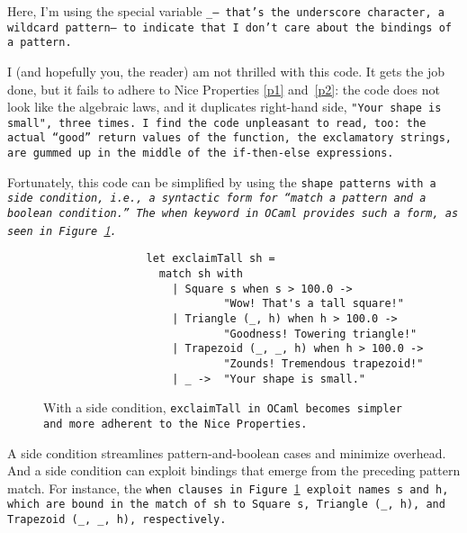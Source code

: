 \documentclass[manuscript,screen,review, 12pt, nonacm]{acmart}
\begin{document}
    Here, I'm using the special variable \tt{\_}--- that's the underscore
    character, a wildcard pattern--- to indicate that I don't care about the
    bindings of a pattern. 

    I (and hopefully you, the reader) am not thrilled with this code. It gets
    the job done, but it fails to adhere to Nice Properties \ref{p1}
    and~\ref{p2}: the code does not look like the algebraic laws, and it
    duplicates right-hand side, \tt{"Your shape is small"}, three times. I find
    the code unpleasant to read, too: the actual “good” return values of the
    function, the exclamatory strings, are gummed up in the middle of the
    \tt{if-then-else} expressions.
    
    Fortunately, this code can be simplified by using the \tt{shape} patterns
    with a \it{side condition}, i.e., a syntactic form for “match a pattern
    \it{and} a boolean condition.” The \tt{when} keyword in OCaml provides such
    a form, as seen in Figure~\ref{fig:whenexclaimtall}.
        
        \begin{figure}[]
            \begin{verbatim}
                let exclaimTall sh =
                  match sh with 
                    | Square s when s > 100.0 ->
                            "Wow! That's a tall square!"
                    | Triangle (_, h) when h > 100.0 ->
                            "Goodness! Towering triangle!"
                    | Trapezoid (_, _, h) when h > 100.0 -> 
                            "Zounds! Tremendous trapezoid!"
                    | _ ->  "Your shape is small." 
                \end{verbatim}
            \caption{With a side condition, \tt{exclaimTall} in OCaml becomes
            simpler and more adherent to the Nice Properties.} 
            \label{fig:whenexclaimtall}
        \end{figure}

    A side condition streamlines pattern-and-boolean cases and minimize
    overhead. And a side condition can exploit bindings that emerge from the
    preceding pattern match. For instance, the \tt{when} clauses in
    Figure~\ref{fig:whenexclaimtall} exploit names \tt{s} and \tt{h}, which are
    bound in the match of \tt{sh} to \tt{Square s}, \tt{Triangle (\_, h)}, and
    \tt{Trapezoid (\_, \_, h)}, respectively. 
\end{document}
